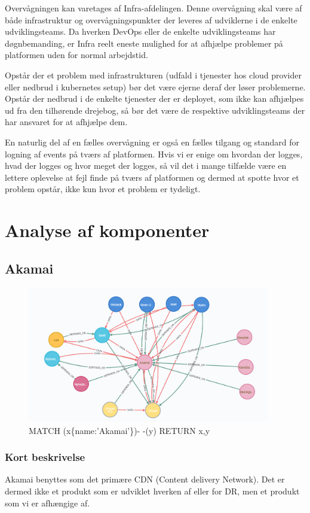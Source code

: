 \documentclass{article}
\begin{document}
Overvågningen kan varetages af Infra-afdelingen. Denne overvågning skal være af både infrastruktur og overvågningspunkter der leveres af udviklerne i de enkelte udviklingsteams. Da hverken DevOps eller de enkelte udviklingsteams har døgnbemanding, er Infra reelt eneste mulighed for at afhjælpe problemer på platformen uden for normal arbejdstid.

Opstår der et problem med infrastrukturen (udfald i tjenester hos cloud provider eller nedbrud i kubernetes setup) bør det være ejerne deraf der løser problemerne. Opstår der nedbrud i de enkelte tjenester der er deployet, som ikke kan afhjælpes ud fra den tilhørende drejebog, så bør det være de respektive udviklingsteams der har ansvaret for at afhjælpe dem.

En naturlig del af en fælles overvågning er også en fælles tilgang og standard for logning af events på tværs af platformen. Hvis vi er enige om hvordan der logges, hvad der logges og hvor meget der logges, så vil det i mange tilfælde være en lettere oplevelse at fejl finde på tværs af platformen og dermed at spotte hvor et problem opstår, ikke kun hvor et problem er tydeligt. 


\section{Analyse af komponenter}

\subsection{Akamai}
\begin{figure}[h]
\includegraphics[width=300pt]{Akamai.PNG}
\caption{MATCH (x\{name:'Akamai'\})- -(y) RETURN x,y}
\end{figure}
\subsubsection{Kort beskrivelse}
Akamai benyttes som det primære CDN (Content delivery Network). 
Det er dermed ikke et produkt som er udviklet hverken af eller for DR, 
men et produkt som vi er afhængige af. 
\end{document}
